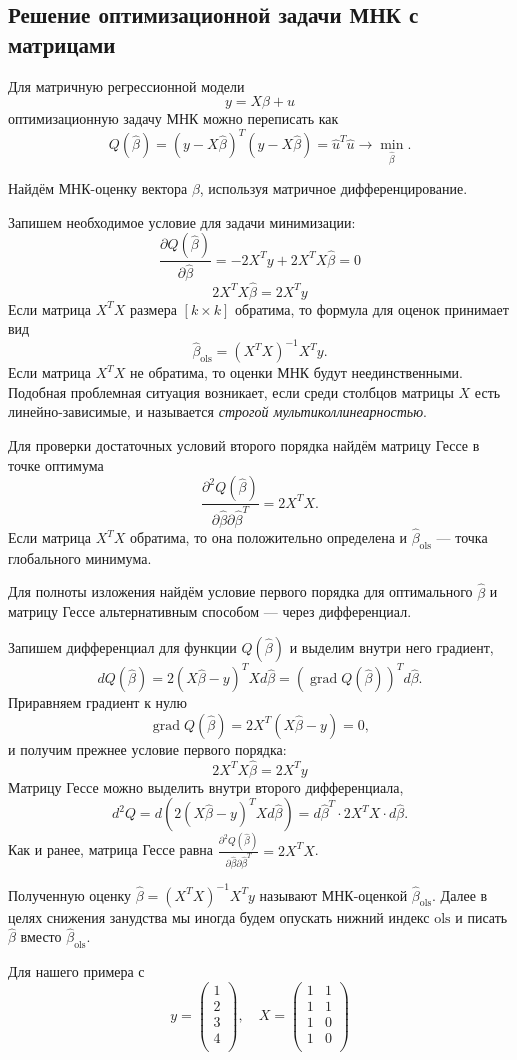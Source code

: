 \documentclass[12pt]{article}
\DeclareMathOperator{\grad}{grad}
\newcommand{\hb}{\hat{\beta}}
\newcommand{\hu}{\hat{u}}
\newcommand{\ols}{\text{ols}}
\begin{document}
\subsection{Решение оптимизационной задачи МНК с матрицами}


Для матричную регрессионной модели
\[
y = X\beta + u
\]
оптимизационную задачу МНК можно переписать как
\[
Q(\hb) = (y-X\hb)^T(y-X\hb) = \hu^T\hu \to \underset{\hb}{\min}.
\]

Найдём МНК-оценку вектора $\beta$, используя матричное дифференцирование.

Запишем необходимое условие для задачи минимизации: 
\[
\frac{\partial Q(\hb)}{\partial \hb} = -2X^{T}y + 2X^TX\hb = 0
\]
\[
2X^TX\hb = 2X^{T}y
\]
Если матрица $X^TX$ размера $[k\times k]$ обратима, то формула для оценок принимает вид
\[
\hb_{\ols} = (X^TX)^{-1}X^Ty.
\]
Если матрица $X^TX$ не обратима, то оценки МНК будут неединственными. 
Подобная проблемная ситуация возникает, если среди столбцов матрицы $X$ есть линейно-зависимые, и называется \emph{строгой мультиколлинеарностью}.

Для проверки достаточных условий второго порядка найдём матрицу Гессе в точке оптимума
\[
\frac{\partial^2 Q(\hb)}{\partial \hb \partial \hb^T} = 2X^TX.
\]
Если матрица $X^TX$ обратима, то она положительно определена и $\hb_{\ols}$ —  точка глобального минимума. 


Для полноты изложения найдём условие первого порядка для оптимального $\hb$ и матрицу Гессе альтернативным способом — через дифференциал.

Запишем дифференциал для функции $Q(\hb)$ и выделим внутри него градиент,
\[
dQ(\hb) = 2(X\hb - y)^TX d\hb = (\grad Q(\hb))^T d\hb.
\]
Приравняем градиент к нулю
\[
\grad Q(\hb) =  2X^T(X\hb - y) = 0,
\]
и получим прежнее условие первого порядка:
\[
2X^TX\hb = 2X^{T}y
\]
Матрицу Гессе можно выделить внутри второго дифференциала,
\[
d^2 Q = d(2(X\hb - y)^TX d\hb) = d\hb^T \cdot 2X^T X \cdot d\hb. 
\]
Как и ранее, матрица Гессе равна $\frac{\partial^2 Q(\hb)}{\partial \hb \partial \hb^T} = 2X^TX$.

Полученную оценку $\hb = (X^TX)^{-1}X^Ty$ называют МНК-оценкой $\hb_{\ols}$. 
Далее в целях снижения занудства мы иногда будем опускать нижний индекс $\ols$ и писать $\hb$ вместо $\hb_{\ols}$.

Для нашего примера с 
\[
y = \begin{pmatrix}
    1 \\
    2 \\
    3 \\
    4 \\
\end{pmatrix}, \quad 
X = \begin{pmatrix}
    1 & 1 \\
    1 & 1 \\
    1 & 0 \\
    1 & 0 \\
\end{pmatrix}
\]
\end{document}
